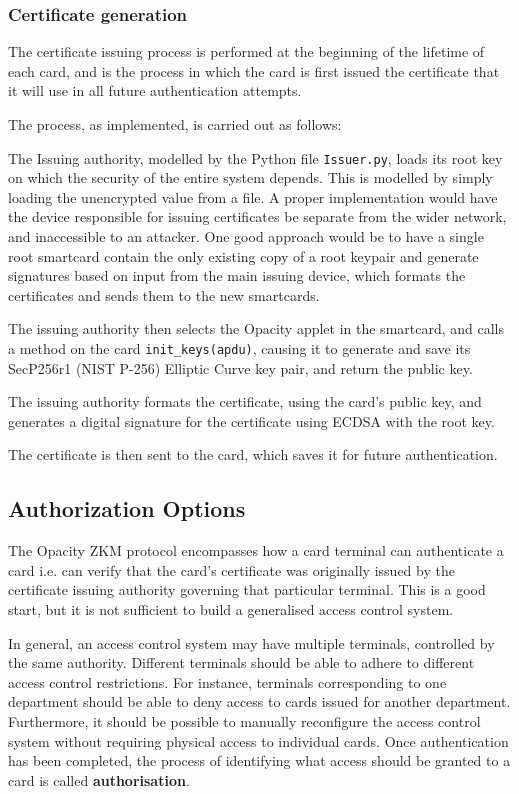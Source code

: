 \documentclass[12pt]{article}
\begin{document}
\subsubsection{Certificate generation}
\label{subsec:certificates}

The certificate issuing process is performed at the beginning of the lifetime of each card, and is the process in which the card is first issued the certificate that it will use in all future authentication attempts.

The process, as implemented, is carried out as follows:

The Issuing authority, modelled by the Python file \verb|Issuer.py|, loads its root key on which the security of the entire system depends. This is modelled by simply loading the unencrypted value from a file. A proper implementation would have the device responsible for issuing certificates be separate from the wider network, and inaccessible to an attacker. One good approach would be to have a single root smartcard contain the only existing copy of a root keypair and generate signatures based on input from the main issuing device, which formats the certificates and sends them to the new smartcards.

The issuing authority then selects the Opacity applet in the smartcard, and calls a method on the card \verb|init_keys(apdu)|, causing it to generate and save its SecP256r1 (NIST P-256) Elliptic Curve key pair, and return the public key.

The issuing authority formats the certificate, using the card's public key, and generates a digital signature for the certificate using ECDSA with the root key.

The certificate is then sent to the card, which saves it for future authentication.



\subsection{Authorization Options}
The Opacity ZKM protocol encompasses how a card terminal can authenticate a card i.e. can verify that the card's certificate was originally issued by the certificate issuing authority governing that particular terminal. This is a good start, but it is not sufficient to build a generalised access control system.

In general, an access control system may have multiple terminals, controlled by the same authority. Different terminals should be able to adhere to different access control restrictions. For instance, terminals corresponding to one department should be able to deny access to cards issued for another department. Furthermore, it should be possible to manually reconfigure the access control system without requiring physical access to individual cards. Once authentication has been completed, the process of identifying what access should be granted to a card is called \textbf{authorisation}.
\end{document}
